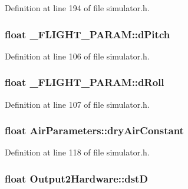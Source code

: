 \-Definition at line 194 of file simulator.\-h.

\hypertarget{group___h_i_t_l_plugin_gaff13db0c35d76e6eda91b623fb0fef8b}{
\subsubsection[{d\-Pitch}]{\setlength{\rightskip}{0pt plus 5cm}float {\bf \-\_\-\-F\-L\-I\-G\-H\-T\-\_\-\-P\-A\-R\-A\-M\-::d\-Pitch}}}\label{group___h_i_t_l_plugin_gaff13db0c35d76e6eda91b623fb0fef8b}


\-Definition at line 106 of file simulator.\-h.

\hypertarget{group___h_i_t_l_plugin_gad9c4016b0ff06d6f0c8208ad1a94b281}{
\subsubsection[{d\-Roll}]{\setlength{\rightskip}{0pt plus 5cm}float {\bf \-\_\-\-F\-L\-I\-G\-H\-T\-\_\-\-P\-A\-R\-A\-M\-::d\-Roll}}}\label{group___h_i_t_l_plugin_gad9c4016b0ff06d6f0c8208ad1a94b281}


\-Definition at line 107 of file simulator.\-h.

\hypertarget{group___h_i_t_l_plugin_ga343d7519080c3b70a59e554bfc2ed57d}{
\subsubsection[{dry\-Air\-Constant}]{\setlength{\rightskip}{0pt plus 5cm}float {\bf \-Air\-Parameters\-::dry\-Air\-Constant}}}\label{group___h_i_t_l_plugin_ga343d7519080c3b70a59e554bfc2ed57d}


\-Definition at line 118 of file simulator.\-h.

\hypertarget{group___h_i_t_l_plugin_gaf1362ebbee3efc97a9c205aaffdeb98a}{
\subsubsection[{dst\-D}]{\setlength{\rightskip}{0pt plus 5cm}float {\bf \-Output2\-Hardware\-::dst\-D}}}\label{group___h_i_t_l_plugin_gaf1362ebbee3efc97a9c205aaffdeb98a}


